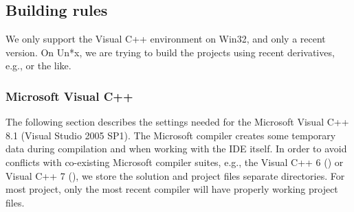 \subsection{Building rules}
We only support the Visual C++ environment on Win32, and only a recent version.
On Un*x, we are trying to build the projects using recent  derivatives, e.g.,  or the like.

\subsubsection{Microsoft Visual C++}\label{ssec:visualc}
The following section describes the settings needed for the Microsoft Visual C++ 8.1 (Visual Studio 2005 SP1).
The Microsoft compiler creates some temporary data during compilation and when working with the IDE itself.
In order to avoid conflicts with co-existing Microsoft compiler suites, e.g., the Visual C++ 6 () or Visual C++ 7 (), we store the solution and project files separate directories.
For most project, only the most recent compiler will have properly working project files.

